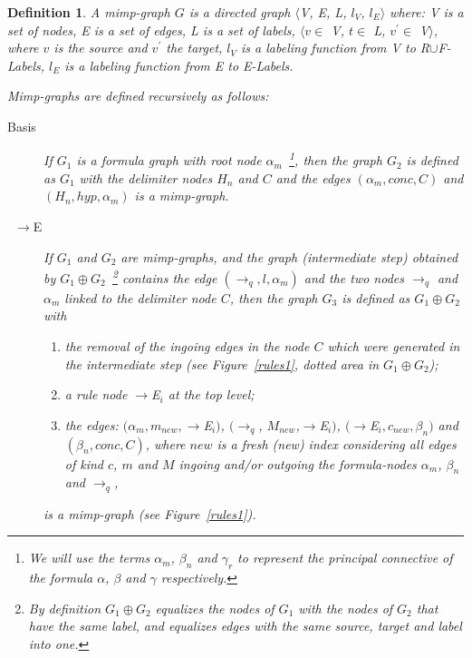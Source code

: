 \documentclass[submission,copyright,creativecommons]{eptcs}
\newtheorem{definition}{Definition}
\begin{document}
\begin{definition}
\label{defPG} A \emph{mimp-graph} $G$ is a directed graph $\langle$\emph{V, E,
L}, $l_V$, $l_E\rangle$ where: \emph{V} is a set of nodes, \emph{E} is a set
of \emph{edges}, \emph{L} is a set of labels, $\langle v\in$ \emph{V}, $t
\in $ \emph{L}, $v^{\prime}\in $ \emph{V}$\rangle$, where $v$ is the source
and $v^{\prime}$ the target, $l_V$ is a labeling function from \emph{V} to 
\emph{R$\cup$F-Labels}, $l_E$ is a labeling function from \emph{E} to \emph{
E-Labels}.



Mimp-graphs are defined recursively as follows:
\begin{description}
\item[Basis]  If $G_1$ is a formula graph with root node $\alpha_m$~\footnote{We will use the terms $\alpha_m$, $\beta_n$ and $\gamma_r$ to represent the
principal connective of the formula $\alpha$, $\beta$ and $\gamma$
respectively.}, then the graph $G_2$ is defined as $G_1$ with the delimiter
nodes $H_n$ and $C$ and the edges $(\alpha_m, conc, C)$ and $(H_n, hyp,
\alpha_m)$ is a mimp-graph.
	
\item[\ $\to$E]  If $G_1$ and $G_2$ are mimp-graphs, and the graph (intermediate step) 
obtained by  $G_1 \oplus G_2$~\footnote{By definition $G_1 \oplus G_2$ equalizes the nodes of $G_1$ with the nodes
of $G_2$ that have the same label, and equalizes edges with the same source,
target and label into one. } contains the edge $(\to_q, l,\alpha_m)$ and the
two nodes $\to_q$ and $\alpha_m$ linked to the delimiter node $C$, then the
graph $G_3$ is defined as $G_1 \oplus G_2$ with
	
\begin{enumerate}
\item  the removal of the ingoing edges in the node $C$ which were generated 
in the intermediate step (see Figure~\ref{rules1}, dotted area in $G_1 \oplus G_2$);

\item  a rule node $\to$E$_i$ at the top level;

\item  the edges: $(\alpha_m, m_{new},\to$E$_i)$, $(\to_q$, $M_{new}$,$\to$E$_i)$, 
	$(\to$E$_i, c_{new}, \beta_n)$ and $(\beta_n, conc, C)$, where $new$ is a fresh (new) 
	index considering all edges of kind $c$, $m$ and $M$ ingoing and/or outgoing the formula-nodes
        $\alpha_m$, $\beta_n$ and $\to_q$,
\end{enumerate}
is a mimp-graph (see Figure~\ref{rules1}).


\end{description}
\end{definition}
\end{document}
